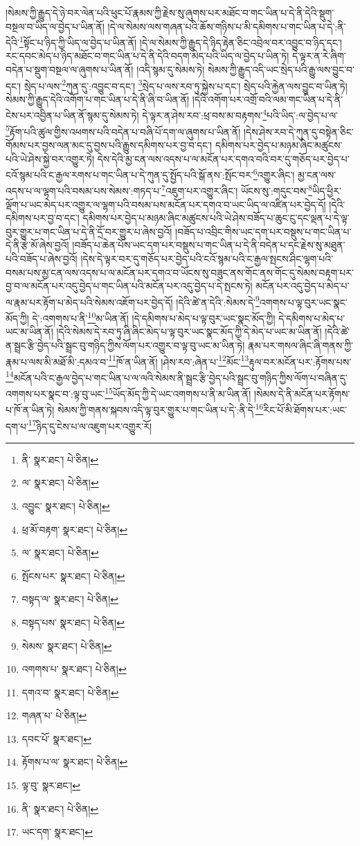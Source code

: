 །སེམས་ཀྱི་རྒྱུད་དེ་ཉེ་བར་ལེན་པའི་ཕུང་པོ་རྣམས་ཀྱི་རྗེས་སུ་ཞུགས་པར་མཐོང་བ་གང་ཡིན་པ་དེ་ནི་དེའི་སྡུག་བསྔལ་བ་ཡིད་ལ་བྱེད་པ་ཡིན་ནོ། །དེ་ལ་སེམས་ལས་གཞན་པའི་ཆོས་གཉིས་པ་མི་དམིགས་པ་གང་ཡིན་པ་དེ་:ནི་དེའི་\footnote{ནི་  སྣར་ཐང་།  པེ་ཅིན། }སྟོང་པ་ཉིད་ཀྱི་ཡིད་ལ་བྱེད་པ་ཡིན་ནོ། །དེ་ལ་སེམས་ཀྱི་རྒྱུད་དེ་ཉིད་རྟེན་ཅིང་འབྲེལ་བར་འབྱུང་བ་ཉིད་དང་། རང་དབང་མེད་པ་ཉིད་མཐོང་བ་གང་ཡིན་པ་དེ་ནི་དེའི་བདག་མེད་པའི་ཡིད་ལ་བྱེད་པ་ཡིན་ཏེ། དེ་ལྟར་ན་རེ་ཞིག་བདེན་པ་སྡུག་བསྔལ་ལ་ཞུགས་པ་ཡིན་ནོ། །འདི་སྙམ་དུ་སེམས་ཏེ། སེམས་ཀྱི་རྒྱུད་འདི་ཡང་སྲེད་པའི་རྒྱུ་ལས་བྱུང་བ་དང་། སྲེད་པ་ལས་\footnote{ལ་  སྣར་ཐང་།  པེ་ཅིན། }ཀུན་དུ་:འབྱུང་བ་དང་། \footnote{འབྱུང་  སྣར་ཐང་།  པེ་ཅིན། }སྲེད་པ་ལས་རབ་ཏུ་སྐྱེས་པ་དང་། སྲེད་པའི་རྐྱེན་ལས་བྱུང་བ་ཡིན་ཏེ། སེམས་ཀྱི་རྒྱུད་དེའི་འགོག་པ་གང་ཡིན་པ་དེ་ནི་ཞི་བ་ཡིན་ནོ། །དེའི་འགོག་པར་འགྲོ་བའི་ལམ་གང་ཡིན་པ་དེ་ནི་ངེས་པར་འབྱིན་པ་ཡིན་ནོ་སྙམ་དུ་སེམས་ཏེ། དེ་ལྟར་ན་ཤེས་རབ་:ཕྲ་བས་མ་བརྟགས་\footnote{ཕྲ་མོ་བརྟག་  སྣར་ཐང་།  པེ་ཅིན། }པའི་ཡིད་:ལ་བྱེད་པ་ལ་\footnote{ལ་  སྣར་ཐང་།  པེ་ཅིན། }རྟོག་པའི་ཚུལ་གྱིས་འཕགས་པའི་བདེན་པ་བཞི་པོ་དག་ལ་ཞུགས་པ་ཡིན་ནོ། །དེས་ཤེས་རབ་དེ་ཀུན་དུ་བསྟེན་ཅིང་གོམས་པར་བྱས་ལན་མང་དུ་བྱས་པའི་རྒྱུས་དམིགས་པར་བྱ་བ་དང་། དམིགས་པར་བྱེད་པ་མཉམ་ཞིང་མཚུངས་པའི་ཡེ་ཤེས་སྐྱེ་བར་འགྱུར་ཏེ། དེས་དེའི་མྱ་ངན་ལས་འདས་པ་ལ་མངོན་པར་དགའ་བའི་བར་དུ་གཅོད་པར་བྱེད་པ་ངའོ་སྙམ་པའི་ང་རྒྱལ་རགས་པ་གང་ཡིན་པ་དེ་ཀུན་དུ་སྤྱོད་པའི་སྒོ་ནས་:སྤོང་བར་\footnote{སྤོངས་པར་  སྣར་ཐང་།  པེ་ཅིན། }འགྱུར་ཞིང་། མྱ་ངན་ལས་འདས་པ་ལ་ལྷག་པའི་བསམ་པས་སེམས་:གཏད་པ་\footnote{བསྟད་ལ་  སྣར་ཐང་།  པེ་ཅིན། }འཇུག་པར་འགྱུར་ཞིང་། ཡོངས་སུ་:གདུང་བས་\footnote{བསྟད་པས་  སྣར་ཐང་།  པེ་ཅིན། }ཡིད་ཕྱིར་ལྡོག་པ་ཡང་མེད་པར་འགྱུར་ལ་ལྷག་པའི་བསམ་པས་མངོན་པར་དགའ་བ་ཡང་ཡིད་ལ་འཛིན་པར་བྱེད་དོ། །དེའི་དམིགས་པར་བྱ་བ་དང་། དམིགས་པར་བྱེད་པ་མཉམ་ཞིང་མཚུངས་པའི་ཡེ་ཤེས་བཟོད་པ་ཆུང་ངུ་དང་ལྡན་པ་དེ་ལྟ་བུར་གྱུར་པ་གང་ཡིན་པ་དེ་ནི་དྲོ་བར་གྱུར་པ་ཞེས་བྱའོ། །བཟོད་པ་འབྲིང་གིས་ཡང་དག་པར་བསྡུས་པ་གང་ཡིན་པ་དེ་ནི་རྩེ་མོ་ཞེས་བྱའོ། །བཟོད་པ་ཆེན་པོས་ཡང་དག་པར་བསྡུས་པ་གང་ཡིན་པ་དེ་ནི་བདེན་པ་དང་རྗེས་སུ་མཐུན་པའི་བཟོད་པ་ཞེས་བྱའོ། །དེས་དེ་ལྟར་བར་དུ་གཅོད་པར་བྱེད་པའི་ངའོ་སྙམ་པའི་ང་རྒྱལ་སྤངས་ཤིང་ལྷག་པའི་བསམ་པས་མྱ་ངན་ལས་འདས་པ་ལ་མངོན་པར་དགའ་བ་ཡོངས་སུ་བཟུང་ནས་གོང་ནས་གོང་དུ་སེམས་བརྟག་པར་བྱ་བ་ལ་མངོན་པར་འདུ་བྱེད་པ་གང་ཡིན་པའི་མངོན་པར་འདུ་བྱེད་པ་དེ་སྤངས་ཏེ། མངོན་པར་འདུ་བྱེད་པ་མེད་པ་ལ་རྣམ་པར་རྟོག་པ་མེད་པའི་སེམས་འཇོག་པར་བྱེད་དོ། །དེའི་ཚེ་ན་དེའི་:སེམས་དེ་\footnote{སེམས་  སྣར་ཐང་།  པེ་ཅིན། }འགགས་པ་ལྟ་བུར་ཡང་སྣང་མོད་ཀྱི། དེ་:འགགས་པ་ནི་\footnote{འགགས་པ་  སྣར་ཐང་།  པེ་ཅིན། }མ་ཡིན་ནོ། །དེ་དམིགས་པ་མེད་པ་ལྟ་བུར་ཡང་སྣང་མོད་ཀྱི། དེ་དམིགས་པ་མེད་པ་ཡང་མ་ཡིན་ནོ། །དེའི་སེམས་དེ་རབ་ཏུ་ཞི་ཞིང་མེད་པ་ལྟ་བུར་ཡང་སྣང་མོད་ཀྱི་དེ་མེད་པ་ཡང་མ་ཡིན་ནོ། །དེའི་ཚེ་ན་སྦྲང་རྩི་བྱེད་པའི་སྦྲང་བུ་གཉིད་ཀྱིས་ལོག་པར་འགྱུར་བ་ལྟ་བུ་ཡང་མ་ཡིན་ཏེ། རྣམ་པར་གསལ་ཞིང་ཞི་གནས་ཀྱི་རྣམ་པ་ལས་མི་མཐོ་མི་:དམའ་བ་\footnote{དགའ་བ་  སྣར་ཐང་།  པེ་ཅིན། }ཁོ་ན་ཡིན་ནོ། །ཤེས་རབ་:ཞེན་པ་\footnote{གཞན་པ་  པེ་ཅིན། }མོང་\footnote{དབང་པོ་  སྣར་ཐང་། }རྟུལ་བར་མངོན་པར་:རྟོགས་པས་\footnote{རྟོགས་པ་ལ་  སྣར་ཐང་།  པེ་ཅིན། }མངོན་པའི་ང་རྒྱལ་བྱེད་པ་གང་ཡིན་པ་ལ་ལའི་སེམས་ནི་སྦྲང་རྩི་བྱེད་པའི་སྦྲང་བུ་གཉིད་ཀྱིས་ལོག་པ་བཞིན་དུ་འགགས་པར་སྣང་བ་:ལྟ་བུ་ཡང་\footnote{ལྟ་བུ་  སྣར་ཐང་། }ཡོད་མོད་ཀྱི་དེ་ཡང་འགགས་པ་ནི་མ་ཡིན་ནོ། །སེམས་དེ་ནི་མངོན་པར་རྟོགས་པ་ཁོ་ན་ཡིན་ཏེ། སེམས་ཀྱི་གནས་སྐབས་འདི་ལྟ་བུར་གྱུར་པ་གང་ཡིན་པ་དེ་:ནི་དེ་\footnote{ནི་  སྣར་ཐང་།  པེ་ཅིན། }རིང་པོ་མི་ཐོགས་པར་:ཡང་དག་པ་\footnote{ཡང་དག་  སྣར་ཐང་། }ཉིད་དུ་ངེས་པ་ལ་འཇུག་པར་འགྱུར་རོ། 